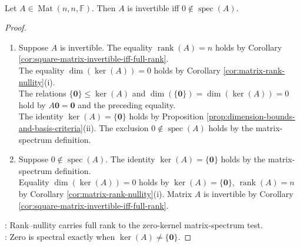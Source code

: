 \begin{corollary} \label{cor:matrix-invertible-iff-zero-not-spectrum} \\
Let $A\in\operatorname{Mat}(n,n,\mathbb{F})$. Then $A$ is invertible iff $0\notin\operatorname{spec}(A)$.
\begin{proof}
\begin{enumerate}[label=\roman*.]
\setlength{\itemsep}{0pt}
\item[$(\Rightarrow)$] Suppose $A$ is invertible. The equality $\operatorname{rank}(A)=n$ holds by Corollary \ref{cor:square-matrix-invertible-iff-full-rank}.\\
The equality $\dim(\ker(A))=0$ holds by Corollary \ref{cor:matrix-rank-nullity}(i).\\
The relations $\{\mathbf{0}\}\leq\ker(A)$ and $\dim(\{\mathbf{0}\})=\dim(\ker(A))=0$ hold by $A\mathbf{0}=\mathbf{0}$ and the preceding equality.\\
The identity $\ker(A)=\{\mathbf{0}\}$ holds by Proposition \ref{prop:dimension-bounds-and-basis-criteria}(ii). The exclusion $0\notin\operatorname{spec}(A)$ holds by the matrix-spectrum definition.
\item[$(\Leftarrow)$] Suppose $0\notin\operatorname{spec}(A)$. The identity $\ker(A)=\{\mathbf{0}\}$ holds by the matrix-spectrum definition.\\
Equality $\dim(\ker(A))=0$ holds by $\ker(A)=\{\mathbf{0}\}$, $\operatorname{rank}(A)=n$ by Corollary \ref{cor:matrix-rank-nullity}(i). Matrix $A$ is invertible by Corollary \ref{cor:square-matrix-invertible-iff-full-rank}.
\end{enumerate}
: Rank--nullity carries full rank to the zero-kernel matrix-spectrum test.\\
: Zero is spectral exactly when $\ker(A)\neq\{\mathbf{0}\}$.
\end{proof}
\end{corollary}
